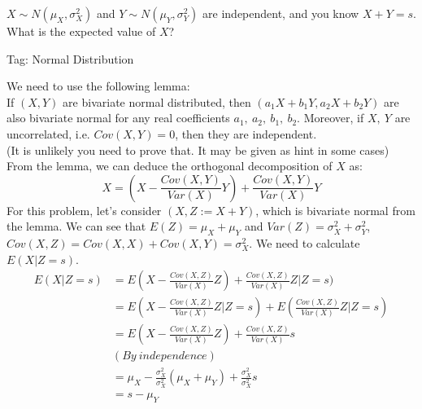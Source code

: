 \begin{exe}
$X \sim N(\mu_X, \sigma_X^2)$ and $Y \sim N(\mu_Y, \sigma_Y^2)$ are independent, and you know $X + Y = s$. What is the expected value of $X$?
\end{exe}
\begin{teacher}
Tag: Normal Distribution
\begin{sol}
We need to use the following lemma:\\ 
If $(X, Y)$ are bivariate normal distributed, then $(a_1X+b_1Y, a_2X+b_2Y)$ are also bivariate normal for any real coefficients $a_1,\ a_2,\ b_1,\ b_2$. Moreover, if $X,\ Y$ are uncorrelated, i.e. $Cov(X, Y)=0$, then they are independent.\\
(It is unlikely you need to prove that. It may be given as hint in some cases)\\
From the lemma, we can deduce the orthogonal decomposition of $X$ as:
$$X=(X-\frac{Cov(X,Y)}{Var(X)}Y) + \frac{Cov(X,Y)}{Var(X)}Y$$
For this problem, let's consider $(X, Z:=X+Y)$, which is bivariate normal from the lemma. We can see that $E(Z) = \mu_X+\mu_Y$ and $Var(Z) = \sigma_X^2+\sigma_Y^2$, $Cov(X,Z)= Cov(X,X)+Cov(X,Y) = \sigma_X^2$. We need to calculate $E(X|Z=s)$.
\begin{align*}
    E(X|Z=s) &=E(X-\frac{Cov(X,Z)}{Var(X)}Z) + \frac{Cov(X,Z)}{Var(X)}Z|Z=s)\\
    &=E(X-\frac{Cov(X,Z)}{Var(X)}Z|Z=s) + E(\frac{Cov(X,Z)}{Var(X)}Z|Z=s)\\
    &=E(X-\frac{Cov(X,Z)}{Var(X)}Z)+\frac{Cov(X,Z)}{Var(X)}s\\
    &(By\ independence)\\
    &=\mu_X - \frac{\sigma_X^2}{\sigma_X^2}(\mu_X+\mu_Y) + \frac{\sigma_X^2}{\sigma_X^2}s\\
    &=s-\mu_Y
\end{align*}
\end{sol}
\end{teacher}

